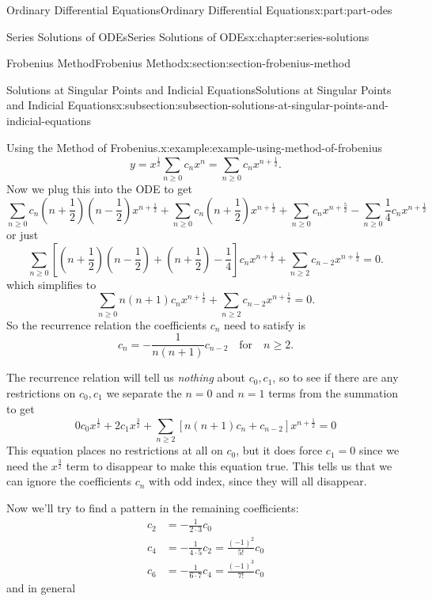 \documentclass[oneside,10pt,]{book}
\numberwithin{equation}{part}
\newcommand{\amp}{&}
\begin{document}
\begin{partptx}{Ordinary Differential Equations}{}{Ordinary Differential Equations}{}{}{x:part:part-odes}
\begin{chapterptx}{Series Solutions of ODEs}{}{Series Solutions of ODEs}{}{}{x:chapter:series-solutions}
\begin{sectionptx}{Frobenius Method}{}{Frobenius Method}{}{}{x:section:section-frobenius-method}
\begin{subsectionptx}{Solutions at Singular Points and Indicial Equations}{}{Solutions at Singular Points and Indicial Equations}{}{}{x:subsection:subsection-solutions-at-singular-points-and-indicial-equations}
\begin{example}{Using the Method of Frobenius.}{x:example:example-using-method-of-frobenius}
\begin{equation*}
y = x^{\frac{1}{2}}\sum_{n\geq0}^{}c_{n}x^{n} = \sum_{n\geq0}^{}c_{n}x^{n+\frac{1}{2}}.
\end{equation*}
Now we plug this into the ODE to get%
\begin{equation*}
\sum_{n\geq0}c_{n}(n+\frac{1}{2})(n-\frac{1}{2})x^{n+\frac{1}{2}} + \sum_{n\geq0}c_{n}(n+\frac{1}{2})x^{n+\frac{1}{2}} 
+ \sum_{n\geq0}c_{n}x^{n+\frac{5}{2}} - \sum_{n\geq0}\frac{1}{4}c_{n}x^{n+\frac{1}{2}}
\end{equation*}
or just%
\begin{equation*}
\sum_{n\geq0}^{}\left[(n+\frac{1}{2})(n-\frac{1}{2})+(n+\frac{1}{2})-\frac{1}{4}\right]c_{n}x^{n+\frac{1}{2}} 
+\sum_{n\geq2}^{}c_{n-2}x^{n+\frac{1}{2}}=0.
\end{equation*}
which simplifies to%
\begin{equation*}
\sum_{n\geq0} n(n+1)c_{n}x^{n+\frac{1}{2}}+\sum_{n\geq2}c_{n-2}x^{n+\frac{1}{2}} = 0.
\end{equation*}
So the recurrence relation the coefficients \(c_{n}\) need to satisfy is%
\begin{equation*}
c_{n} = -\frac{1}{n(n+1)}c_{n-2}\quad\text{for}\quad n\geq2.
\end{equation*}
%
\par
The recurrence relation will tell us \emph{nothing} about \(c_{0},c_{1}\), so to see if there are any restrictions on \(c_{0},c_{1}\) we separate the \(n=0\) and \(n=1\) terms from the summation to get%
\begin{equation*}
0c_{0}x^{\frac{1}{2}}+2c_{1}x^{\frac{3}{2}}+\sum_{n\geq2}^{}\left[n(n+1)c_{n}+c_{n-2}\right]x^{n+\frac{1}{2}}=0
\end{equation*}
This equation places no restrictions at all on \(c_{0}\), but it does force \(c_{1} = 0\) since we need the \(x^{\frac{3}{2}}\) term to disappear to make this equation true. This tells us that we can ignore the coefficients \(c_{n}\) with odd index, since they will all disappear.%
\par
Now we'll try to find a pattern in the remaining coefficients:%
\begin{align*}
c_{2} \amp= -\frac{1}{2\cdot3}c_{0}\\
c_{4} \amp= -\frac{1}{4\cdot5}c_{2} = \frac{(-1)^{2}}{5!}c_{0}\\
c_{6} \amp= -\frac{1}{6\cdot7}c_{4} = \frac{(-1)^{3}}{7!}c_{0}
\end{align*}
and in general%
\begin{equation*}

\end{equation*}
\end{example}
\end{subsectionptx}
\end{sectionptx}
\end{chapterptx}
\end{partptx}
\end{document}
